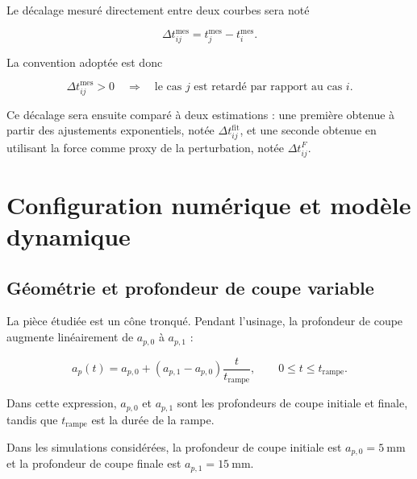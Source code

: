\documentclass[
    11pt,
    a4paper
]{article}
\begin{document}
Le décalage mesuré directement entre deux courbes sera noté

\begin{equation}
    \Delta t_{ij}^{\mathrm{mes}}
    =
    t_j^{\mathrm{mes}}-t_i^{\mathrm{mes}}.
    \label{eq:dt_mes}
\end{equation}

La convention adoptée est donc

\begin{equation}
    \Delta t_{ij}^{\mathrm{mes}}>0
    \quad\Longrightarrow\quad
    \text{le cas \(j\) est retardé par rapport au cas \(i\)}.
\end{equation}

Ce décalage sera ensuite comparé à deux estimations : une première obtenue à
partir des ajustements exponentiels, notée
\(\Delta t_{ij}^{\mathrm{fit}}\), et une seconde obtenue en utilisant la force
comme proxy de la perturbation, notée \(\Delta t_{ij}^{F}\).




\section{Configuration numérique et modèle dynamique}
\label{sec:configuration}

\subsection{Géométrie et profondeur de coupe variable}
\label{subsec:geometrie}

La pièce étudiée est un cône tronqué. Pendant l'usinage, la profondeur de coupe
augmente linéairement de \(a_{p,0}\) à \(a_{p,1}\) :

\begin{equation}
    a_p(t)
    =
    a_{p,0}
    +
    \left(a_{p,1}-a_{p,0}\right)
    \frac{t}{t_{\mathrm{rampe}}},
    \qquad
    0 \leq t \leq t_{\mathrm{rampe}}.
    \label{eq:rampe_ap}
\end{equation}

Dans cette expression, \(a_{p,0}\) et \(a_{p,1}\) sont les profondeurs de coupe
initiale et finale, tandis que \(t_{\mathrm{rampe}}\) est la durée de la rampe.

Dans les simulations considérées, la profondeur de coupe initiale est \(a_{p,0}=\SI{5}{\milli\metre}\) et la profondeur de coupe finale est \(a_{p,1}=\SI{15}{\milli\metre}\).
\end{document}
